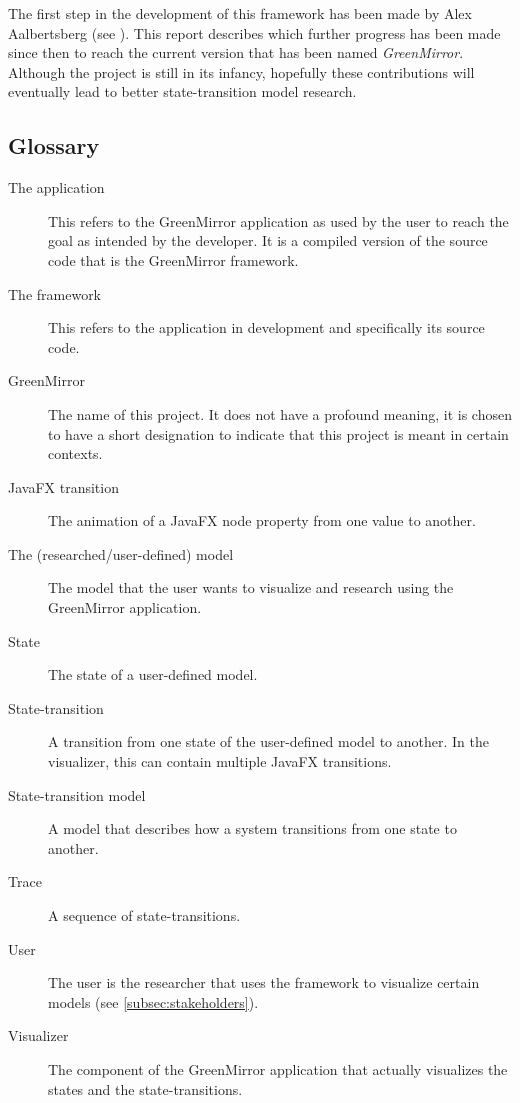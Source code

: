 \documentclass[a4paper]{article}
\begin{document}
The first step in the development of this framework has been made by Alex Aalbertsberg (see \cite{aalbertsberg2015}). This report describes which further progress has been made since then to reach the current version that has been named \emph{GreenMirror}. Although the project is still in its infancy, hopefully these contributions will eventually lead to better state-transition model research.


\subsection{Glossary}\label{subsec:glossary}
\begin{description}
\item[The application] This refers to the GreenMirror application as used by the user to reach the goal as intended by the developer. It is a compiled version of the source code that is the GreenMirror framework.
\item[The framework] This refers to the application in development and specifically its source code.
\item[GreenMirror] The name of this project. It does not have a profound meaning, it is chosen to have a short designation to indicate that this project is meant in certain contexts.
\item[JavaFX transition] The animation of a JavaFX node property from one value to another.
\item[The (researched/user-defined) model] The model that the user wants to visualize and research using the GreenMirror application.
\item[State] The state of a user-defined model.
\item[State-transition] A transition from one state of the user-defined model to another. In the visualizer, this can contain multiple JavaFX transitions.
\item[State-transition model] A model that describes how a system transitions from one state to another.
\item[Trace] A sequence of state-transitions.
\item[User] The user is the researcher that uses the framework to visualize certain models (see \cref{subsec:stakeholders}).
\item[Visualizer] The component of the GreenMirror application that actually visualizes the states and the state-transitions.
\end{description}
\end{document}
